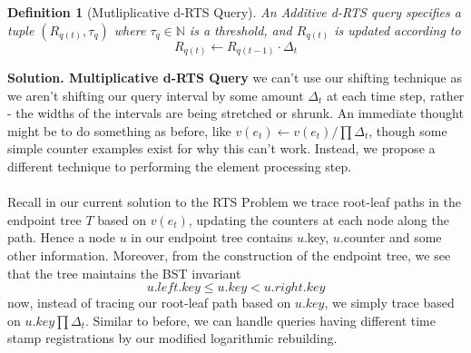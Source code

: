 \documentclass{article}
\newtheorem{definition}{Definition}
\begin{document}
\vspace{5mm}

\begin{definition}[Mutliplicative d-RTS Query]
    An Additive d-RTS query specifies a tuple $(R_{q(t)}, \tau_q)$ where $\tau_q\in \mathbb{N}$ is a threshold, and $R_{q(t)}$ is updated according to
    $$R_{q(t)} \leftarrow R_{q(t-1)} \cdot \Delta_t$$
\end{definition}
\textbf{Solution. Multiplicative d-RTS Query} we can't use our shifting technique as we aren't shifting our query interval by some amount $\Delta_t$ at each time step, rather - the widths of the intervals are being stretched or shrunk. An immediate thought might be to do something as before, like $v(e_t) \leftarrow v(e_t) / \prod \Delta_t$, though some simple counter examples exist for why this can't work. Instead, we propose a different technique to performing the element processing step. \\
\\
Recall in our current solution to the RTS Problem we trace root-leaf paths in the endpoint tree $T$ based on $v(e_t)$, updating the counters at each node along the path. Hence a node $u$ in our endpoint tree contains $u$.key, $u$.counter and some other information. Moreover, from the construction of the endpoint tree, we see that the tree maintains the BST invariant 
$$u.left.key \leq u.key < u.right.key$$
now, instead of tracing our root-leaf path based on $u.key$, we simply trace based on $u.key  \prod \Delta_t$. Similar to before, we can handle queries having different time stamp registrations by our modified logarithmic rebuilding.
\end{document}
